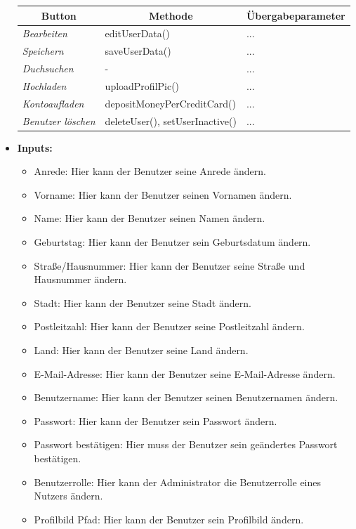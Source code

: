 \begin{itemize}
					\begin{center}
						\begin{longtable}{|p{4cm} |p{6cm} | p{4cm}|}
							
							\hline \multicolumn{1}{|c|}{\textbf{Button}} & \multicolumn{1}{|c|}{\textbf{Methode}} & \multicolumn{1}{|c|}{\textbf{\"{U}bergabeparameter}} \\ \hline
							\endfirsthead
							\hline
							\endlastfoot
							
							\textit{Bearbeiten } & editUserData() & ... \\ \hline
							\textit{Speichern } & saveUserData() & ... \\ \hline
							\textit{Duchsuchen } & - & ... \\ \hline
							\textit{Hochladen } & uploadProfilPic() & ... \\ \hline
							\textit{Kontoaufladen } & depositMoneyPerCreditCard() & ... \\ \hline
							\textit{Benutzer löschen} &  deleteUser(), setUserInactive()  & ... \\ \hline
						\end{longtable}
					\end{center}
				
			\item \textbf{Inputs:}
				\begin{itemize}
					\item Anrede: Hier kann der Benutzer seine Anrede ändern.
					\item Vorname: Hier kann der Benutzer seinen Vornamen ändern.
					\item Name: Hier kann der Benutzer seinen Namen ändern.
					\item Geburtstag: Hier kann der Benutzer sein Geburtsdatum ändern.
					\item Straße/Hausnummer: Hier kann der Benutzer seine Straße und Hausnummer ändern.
					\item Stadt: Hier kann der Benutzer seine Stadt ändern.
					\item Postleitzahl: Hier kann der Benutzer seine Postleitzahl ändern.
					\item Land: Hier kann der Benutzer seine Land ändern.
					\item E-Mail-Adresse: Hier kann der Benutzer seine E-Mail-Adresse ändern.
					\item Benutzername: Hier kann der Benutzer seinen Benutzernamen ändern.
					\item Passwort: Hier kann der Benutzer sein Passwort ändern.
					\item Passwort bestätigen: Hier muss der Benutzer sein geändertes Passwort bestätigen.
					\item Benutzerrolle: Hier kann der Administrator die Benutzerrolle eines Nutzers ändern.
					\item Profilbild Pfad: Hier kann der Benutzer sein Profilbild ändern.
				\end{itemize}
				

\end{itemize}
